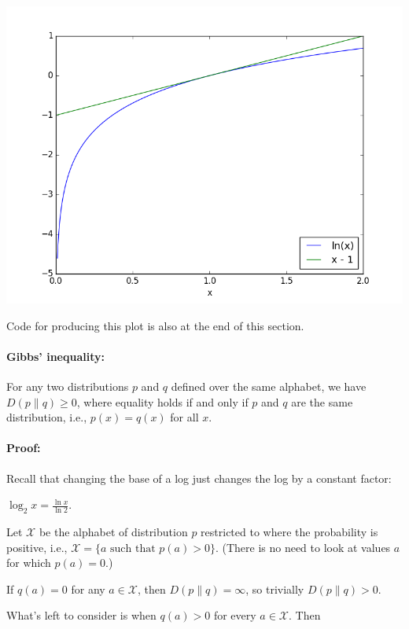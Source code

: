 \documentclass[6008notes.tex]{subfiles}
\begin{document}
{\centering\includegraphics[scale=0.4]{images_sec-gibbs-inequality-helper} \par}

Code for producing this plot is also at the end of this section.

\paragraph{Gibbs' inequality:} For any two distributions $p$ and $q$ defined over the same alphabet, we have $D(p\parallel q)\ge 0$, where equality holds if and only if $p$ and $q$ are the same distribution, i.e., $p(x)=q(x)$ for all $x$.

\paragraph{Proof:} Recall that changing the base of a log just changes the log by a constant factor:

{\centering$\log _{2}x=\frac{\ln x}{\ln 2}.$ \par}

Let $\mathcal{X}$ be the alphabet of distribution $p$ restricted to where the probability is positive, i.e., $\mathcal{X}=\{ a\text { such that }p(a)>0\}$. (There is no need to look at values $a$ for which $p(a)=0$.)

If $q(a)=0$ for any $a\in \mathcal{X}$, then $D(p\parallel q)=\infty$, so trivially $D(p\parallel q)>0$.

What's left to consider is when $q(a)>0$ for every $a\in \mathcal{X}$. Then

{ \par}
		
\end{document}
